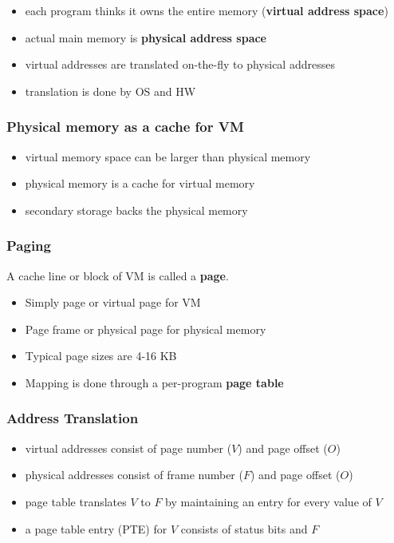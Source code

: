 \documentclass{article}
\begin{document}
\begin{itemize}
	\item each program thinks it owns the entire memory (\textbf{virtual address space})
	\item actual main memory is \textbf{physical address space}
	\item virtual addresses are translated on-the-fly to physical addresses
	\item translation is done by OS and HW
\end{itemize}

\subsubsection{Physical memory as a cache for VM}

\begin{itemize}
	\item virtual memory space can be larger than physical memory
	\item physical memory is a cache for virtual memory
	\item secondary storage backs the physical memory
\end{itemize}

\subsubsection{Paging}

\begin{definition}
	A cache line or block of VM is called a \textbf{page}.
	\begin{itemize}
		\item Simply page or virtual page for VM
		\item Page frame or physical page for physical memory
	\end{itemize}
\end{definition}
\begin{itemize}
	\item Typical page sizes are 4-16 KB
	\item Mapping is done through a per-program \textbf{page table}
\end{itemize}

\subsubsection{Address Translation}

\begin{itemize}
	\item virtual addresses consist of page number ($V$) and page offset ($O$)
	\item physical addresses consist of frame number ($F$) and page offset ($O$)
	\item page table translates $V$ to $F$ by maintaining an entry for every value of $V$
	\item a page table entry (PTE) for $V$ consists of status bits and $F$
\end{itemize}
\end{document}
